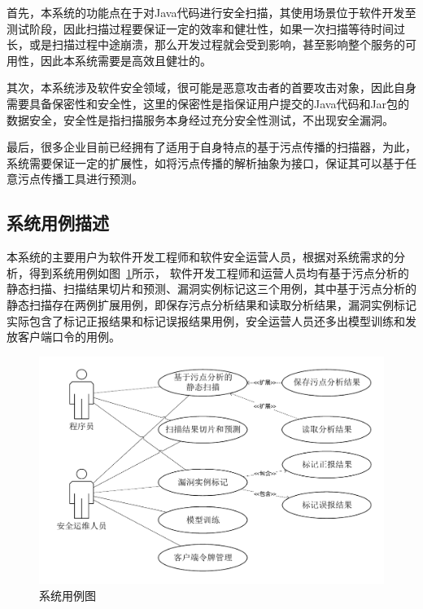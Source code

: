 首先，本系统的功能点在于对Java代码进行安全扫描，其使用场景位于软件开发至测试阶段，因此扫描过程要保证一定的效率和健壮性，如果一次扫描等待时间过长，或是扫描过程中途崩溃，那么开发过程就会受到影响，甚至影响整个服务的可用性，因此本系统需要是高效且健壮的。

其次，本系统涉及软件安全领域，很可能是恶意攻击者的首要攻击对象，因此自身需要具备保密性和安全性，这里的保密性是指保证用户提交的Java代码和Jar包的数据安全，安全性是指扫描服务本身经过充分安全性测试，不出现安全漏洞。

最后，很多企业目前已经拥有了适用于自身特点的基于污点传播的扫描器，为此，系统需要保证一定的扩展性，如将污点传播的解析抽象为接口，保证其可以基于任意污点传播工具进行预测。\\

\subsection{系统用例描述}\label{sec:case}
本系统的主要用户为软件开发工程师和软件安全运营人员，根据对系统需求的分析，得到系统用例如图~\ref{fig:case}所示， 软件开发工程师和运营人员均有基于污点分析的静态扫描、扫描结果切片和预测、漏洞实例标记这三个用例，其中基于污点分析的静态扫描存在两例扩展用例，即保存污点分析结果和读取分析结果，漏洞实例标记实际包含了标记正报结果和标记误报结果用例，安全运营人员还多出模型训练和发放客户端口令的用例。

\begin{figure}[!htbp]
	\centering
	\includegraphics[width=5in]{FIGs/chapter3/case.pdf}
	\caption{系统用例图}\label{fig:case}
\end{figure}

\setcounter{caseCounter}{1}

